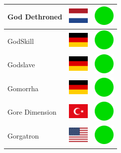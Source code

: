 \documentclass[12pt, a4paper, twoside]{report}
\begin{document}
\begin{center}
\begin{longtable}{|p{5cm}|p{2cm}|p{2cm}|}
 God Dethroned                                              & \includegraphics[width=1cm]{../img/flags/nl} &   \includegraphics[width=1cm]{../likes/y} \\ \hline
 GodSkill                                                   & \includegraphics[width=1cm]{../img/flags/de} &   \includegraphics[width=1cm]{../likes/y} \\ \hline
 Godslave                                                   & \includegraphics[width=1cm]{../img/flags/de} &   \includegraphics[width=1cm]{../likes/y} \\ \hline
 Gomorrha                                                   & \includegraphics[width=1cm]{../img/flags/de} &   \includegraphics[width=1cm]{../likes/y} \\ \hline
 Gore Dimension                                             & \includegraphics[width=1cm]{../img/flags/tr} &   \includegraphics[width=1cm]{../likes/y} \\ \hline
 Gorgatron                                                  & \includegraphics[width=1cm]{../img/flags/us} &   \includegraphics[width=1cm]{../likes/y} \\ \hline

\end{longtable}
\end{center}
\end{document}
